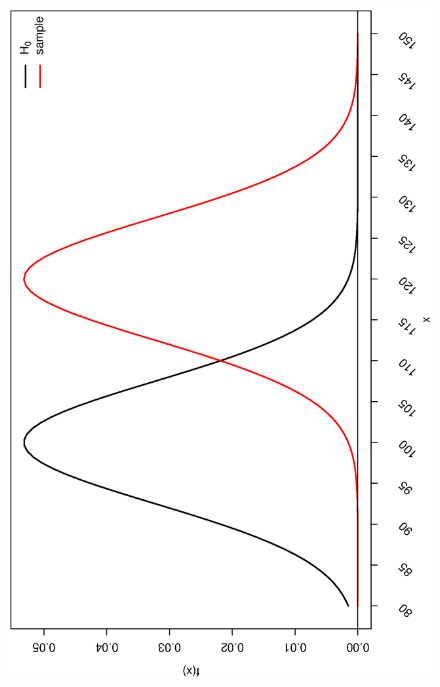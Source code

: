\documentclass[captions=tableheading, 12pt, headings=small, parskip=half]{scrartcl}
\begin{document}
\begin{enumerate}[label = \alph*)]
	\begin{figure}[H]
		\centering
		\includegraphics[height = \columnwidth, angle = -90]{Code1/IQ.eps}
	\end{figure}
\end{enumerate}
\end{document}
